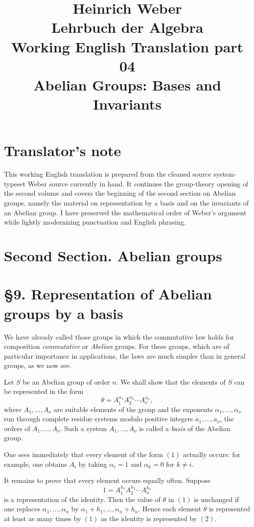 \documentclass[11pt]{article}
\title{Heinrich Weber\\Lehrbuch der Algebra\\Working English Translation part 04\\Abelian Groups: Bases and Invariants}
\author{}
\date{}
\begin{document}
\maketitle

\section*{Translator's note}
This working English translation is prepared from the cleaned source system-typeset Weber source currently in hand. It continues the group-theory opening of the second volume and covers the beginning of the second section on Abelian groups, namely the material on representation by a basis and on the invariants of an Abelian group. I have preserved the mathematical order of Weber's argument while lightly modernizing punctuation and English phrasing.

\section*{Second Section. Abelian groups}

\section*{\S 9. Representation of Abelian groups by a basis}

We have already called those groups in which the commutative law holds for composition \emph{commutative} or \emph{Abelian} groups. For these groups, which are of particular importance in applications, the laws are much simpler than in general groups, as we now see.

Let \(S\) be an Abelian group of order \(n\). We shall show that the elements of \(S\) can be represented in the form
\[
\theta=A_1^{\alpha_1}A_2^{\alpha_2}\cdots A_\nu^{\alpha_\nu},
\tag{1}
\]
where \(A_1,\dots,A_\nu\) are suitable elements of the group and the exponents \(\alpha_1,\dots,\alpha_\nu\) run through complete residue systems modulo positive integers \(a_1,\dots,a_\nu\), the orders of \(A_1,\dots,A_\nu\). Such a system \(A_1,\dots,A_\nu\) is called a \emph{basis} of the Abelian group.

One sees immediately that every element of the form \((1)\) actually occurs: for example, one obtains \(A_i\) by taking \(\alpha_i=1\) and \(\alpha_k=0\) for \(k\neq i\).

It remains to prove that every element occurs equally often. Suppose
\[
1=A_1^{h_1}A_2^{h_2}\cdots A_n^{h_n}
\tag{2}
\]
is a representation of the identity. Then the value of \(\theta\) in \((1)\) is unchanged if one replaces \(\alpha_1,\dots,\alpha_n\) by \(\alpha_1+h_1,\dots,\alpha_n+h_n\). Hence each element \(\theta\) is represented at least as many times by \((1)\) as the identity is represented by \((2)\).
\end{document}
